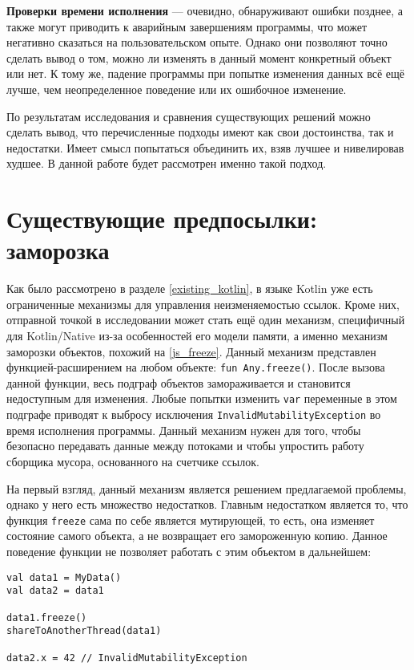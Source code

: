 \documentclass[specification,annotation,times]{itmo-student-thesis}
\begin{document}
\textbf{Проверки времени исполнения} --- очевидно, обнаруживают ошибки позднее, а также могут приводить к аварийным завершениям программы, что может негативно сказаться на пользовательском опыте.
Однако они позволяют точно сделать вывод о том, можно ли изменять в данный момент конкретный объект или нет.
К тому же, падение программы при попытке изменения данных всё ещё лучше, чем неопределенное поведение или их ошибочное изменение.  

По результатам исследования и сравнения существующих решений можно сделать вывод, что перечисленные подходы имеют как свои достоинства, так и недостатки.
Имеет смысл попытаться объединить их, взяв лучшее и нивелировав худшее. В данной работе будет рассмотрен именно такой подход.


\section{Существующие предпосылки: заморозка}

Как было рассмотрено в разделе \ref{existing_kotlin}, в языке Kotlin уже есть ограниченные механизмы для управления неизменяемостью ссылок.
Кроме них, отправной точкой в исследовании может стать ещё один механизм, специфичный для Kotlin/Native из-за особенностей его модели памяти, а именно механизм заморозки объектов, похожий на \ref{js_freeze}.
Данный механизм представлен функцией-расширением на любом объекте: \texttt{fun Any.freeze()}.
После вызова данной функции, весь подграф объектов замораживается и становится недоступным для изменения.
Любые попытки изменить \texttt{var} переменные в этом подграфе приводят к выбросу исключения \texttt{InvalidMutabilityException} во время исполнения программы.
Данный механизм нужен для того, чтобы безопасно передавать данные между потоками и чтобы упростить работу сборщика мусора, основанного на счетчике ссылок.

На первый взгляд, данный механизм является решением предлагаемой проблемы, однако у него есть множество недостатков.
Главным недостатком является то, что функция \texttt{freeze} сама по себе является мутирующей, то есть, она изменяет состояние самого объекта, а не возвращает его замороженную копию.
Данное поведение функции не позволяет работать с этим объектом в дальнейшем:

\begin{lstlisting}[caption={Заморозка изначального объекта}]
val data1 = MyData()
val data2 = data1

data1.freeze()
shareToAnotherThread(data1)

data2.x = 42 // InvalidMutabilityException
\end{lstlisting}
\end{document}

